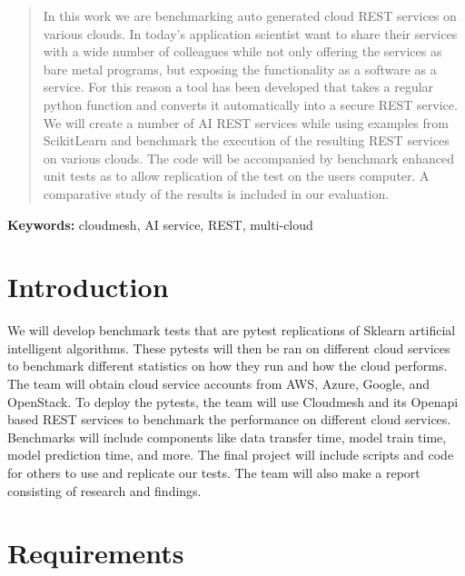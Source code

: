 
\tableofcontents

\verbatimfont{\footnotesize}%

\newcommand{\TODO}[1]{\todo[inline]{#1}}

\begin{abstract}

In this work we are benchmarking auto generated cloud REST services on
various clouds. In today's application scientist want to share their
services with a wide number of colleagues while not only offering the
services as bare metal programs, but exposing the functionality as a
software as a service. For this reason a tool has been developed that
takes a regular python function and converts it automatically into a
secure REST service. We will create a number of AI REST services while
using examples from ScikitLearn and benchmark the execution of the
resulting REST services on various clouds. The code will be accompanied
by benchmark enhanced unit tests as to allow replication of the test on
the users computer. A comparative study of the results is included in
our evaluation.

\end{abstract}

\maketitle

\textbf{Keywords:} cloudmesh, AI service, REST, multi-cloud

\section{Introduction}\label{introduction}

We will develop benchmark tests that are pytest replications of Sklearn
artificial intelligent algorithms. These pytests will then be ran on
different cloud services to benchmark different statistics on how they
run and how the cloud performs. The team will obtain cloud service
accounts from AWS, Azure, Google, and OpenStack. To deploy the pytests,
the team will use Cloudmesh and its Openapi based REST services to
benchmark the performance on different cloud services. Benchmarks will
include components like data transfer time, model train time, model
prediction time, and more. The final project will include scripts and
code for others to use and replicate our tests. The team will also make
a report consisting of research and findings.

\section{Requirements}

